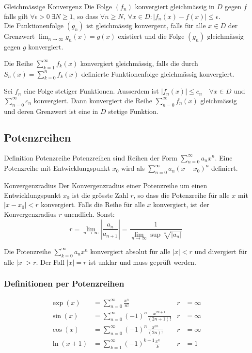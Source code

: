 \documentclass[a4paper,10pt]{article}
\def\limn{\lim_{n\to \infty}}
\def\sumk{\sum_{k=1}^\infty}
\def\sumn{\sum_{n=0}^\infty}
\begin{document}
\begin{mainbox}{Gleichmässige Konvergenz}
 Die Folge $(f_n)$ konvergiert gleichmässig in $D$ gegen $f$ falls gilt $\forall \epsilon > 0 \ \exists N \ge 1$, so dass $\forall n \ge N, \ \forall x \in D: | f_n(x) - f(x) | \le \epsilon$. \\
 Die Funktionenfolge $(g_n)$ ist gleichmässig konvergent, falls für alle $x\in D$ der Grenzwert $\limn g_n(x) = g(x)$ existiert und die Folge $(g_n)$ gleichmässig gegen $g$ konvergiert.
\end{mainbox}
Die Reihe $\sumk f_k(x)$ konvergiert gleichmässig, falls die durch $S_n(x) = \sum_{k=0}^n f_k(x)$ definierte Funktionenfolge gleichmässig konvergiert.

\begin{subbox}{}
 Sei $f_n$ eine Folge stetiger Funktionen. Ausserdem ist $|f_n(x)| \le c_n \quad \forall x \in D$ und $\sum_{n=0}^\infty c_n$ konvergiert. Dann konvergiert die Reihe $\sum_{n=0}^\infty f_n(x)$ gleichmässig und deren Grenzwert ist eine in $D$ stetige Funktion.
\end{subbox}

\subsection{Potenzreihen}
\begin{subbox}{Definition Potenzreihe}
 Potenzreihen sind Reihen der Form $\sum_{n=0}^\infty a_n x^n$. Eine Potenzreihe mit Entwicklungspunkt $x_0$ wird als $\sum_{n=0}^\infty a_n(x-x_0)^n$ definiert.
\end{subbox}

\begin{mainbox}{Konvergenzradius}
 Der Konvergenzradius einer Potenzreihe um einen Entwicklungspunkt $x_0$ ist die grösste Zahl $r$, so dass die Potenzreihe für alle $x$ mit $|x - x_0| < r$ konvergiert. Falls die Reihe für alle $x$ konvergiert, ist der Konvergenzradius $r$ unendlich. Sonst:
 $$r = \limn \left| \frac{a_n}{a_{n+1}} \right| = \frac{1}{\limn\sup \sqrt[n]{|a_n|}} $$
\end{mainbox}
Die Potenzreihe $\sum_{k=0}^\infty a_n x^n$ konvergiert absolut für alle $|x| < r$ und divergiert für alle $|x| > r$. Der Fall $|x| = r$ ist unklar und muss geprüft werden.
\subsubsection{Definitionen per Potenzreihen}
\begin{align*}
\exp(x) &= \sumn \frac{x^n}{n!} & r &= \infty \\
\sin(x) &= \sumn (-1)^n \frac{x^{2n + 1}}{(2n + 1)!} & r &= \infty \\
\cos(x) &= \sumn (-1)^n \frac{x^{2n}}{(2n)!} & r &= \infty \\
\ln(x + 1) &= \sumk (-1)^{k+1} \frac{x^k}{k} & r &= 1
\end{align*}
\end{document}

